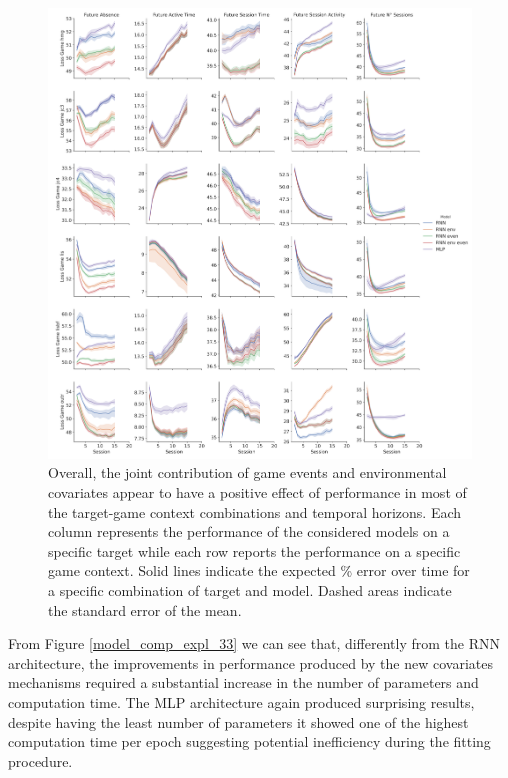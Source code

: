 \begin{figure}[h]
\centering
\includegraphics[height=0.7\textheight,keepaspectratio]{images/chapter_3/models_comparison_non_collapsed_33.png}
\caption[\textbf{Model comparison without collapsing}]{Overall, the joint contribution of game events and environmental covariates appear to have a positive effect of performance in most of the target-game context combinations and temporal horizons. Each column represents the performance of the considered models on a specific target while each row reports the performance on a specific game context. Solid lines indicate the expected \% error over time for a specific combination of target and model. Dashed areas indicate the standard error of the mean.}
\label{model_comp_non_coll_33} 
\end{figure}

From Figure \ref{model_comp_expl_33} we can see that, differently from the RNN architecture, the improvements in performance produced by the new covariates mechanisms required a substantial increase in the number of parameters and computation time. The MLP architecture again produced surprising results, despite having the least number of parameters it showed one of the highest computation time per epoch suggesting potential inefficiency during the fitting procedure.

